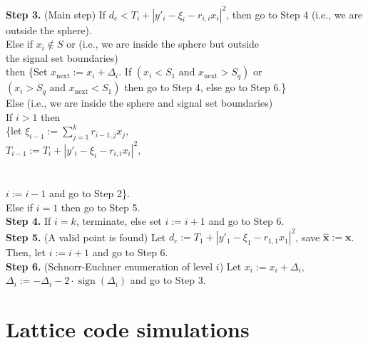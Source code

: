 \documentclass[english,12pt,a4paper,pdftex,sci,utf8]{aaltothesis}
\begin{document}
\noindent \textbf{Step 3.} (Main step) If $d_c < T_i + \left|y'_i-\xi_i-r_{i,i}x_i\right|^2$, then go to Step 4 (i.e., we are\\
\indent outside the sphere).\\
\indent Else if $x_i \not\in S$ or  (i.e., we are inside the sphere but outside \\
\indent the signal set boundaries) \\ 
\indent then \{Set $x_{\text{next}} := x_i + \Delta_i$. If $(x_i < S_1\,\, \text{and}\,\, x_{\text{next}} > S_q)$ or \\
\indent $(x_i > S_q\,\, \text{and}\,\, x_{\text{next}} < S_{1})$ then go to Step 4, else go to Step 6.\}  \\
\indent Else (i.e., we are inside the sphere and signal set boundaries) \\
\indent\indent If $i > 1$ then \\
\indent\indent\indent \{let $\xi_{i-1} := \sum_{j=1}^{k} r_{i-1,j}x_j,$\\ 
\indent\indent\indent $T_{i-1} := T_i + \left|y'_i-\xi_i-r_{i,i}x_i\right|^2,$\\
\indent\indent\indent {} \\
\indent\indent\indent {}\\
\indent\indent\indent $i := i - 1$ and go to Step 2\}. \\
\indent\indent Else if $i=1$ then go to Step 5. \\

\noindent \textbf{Step 4.} If $i = k$, terminate, else set $i := i+1$ and go to Step 6.\\

\noindent \textbf{Step 5.} (A valid point is found) Let $d_c := T_1 + \left|y'_1-\xi_1-r_{1,1}x_1\right|^2$, save $\mathbf{\hat{x}} := \mathbf{x}$. \\
\indent Then, let $i := i+1$ and go to Step 6.\\

\noindent \textbf{Step 6.} (Schnorr-Euchner enumeration of level $i$) Let $x_i := x_i + \Delta_i,$\\
\indent $\Delta_i := -\Delta_i - 2\cdot\operatorname{sign}(\Delta_i)  $ and go to Step 3.\\

\clearpage

\section{Lattice code simulations}
\label{sec:sims}
\end{document}
